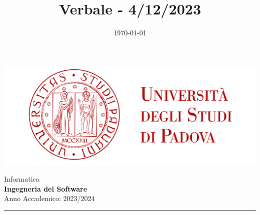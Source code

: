 \documentclass[5pt]{article}
\title{ Verbale - 4/12/2023 }
\date{\today}
\begin{document}


    \vspace{8pt}
    \includegraphics[scale=0.2]{UNIPDFull.png}

\vspace{10pt}

\begin{minipage}[t]{0.48\textwidth}
        \begin{flushleft}
            Informatica\\
            \vspace{5pt}
            \textbf{\LARGE Ingegneria del Software}\\
            Anno Accademico: 2023/2024
        \end{flushleft}
\end{minipage}


\vspace{5px}


\rule{\textwidth}{5pt}
\end{document}
